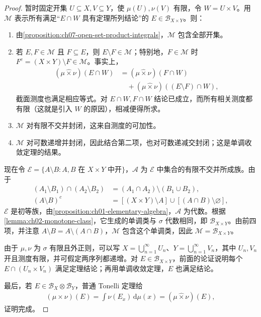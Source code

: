 \documentclass[../../main.tex]{subfiles}
\begin{document}
\begin{proof}
暂时固定开集 $U\subseteq X,V\subseteq Y$，使 $\mu(U),\nu(V)$ 有限，令 $W=U\times V$。用 $\mathcal M$ 表示所有满足“$E\cap W$ 具有定理所列结论”的 $E\in\mathscr B_{X\times Y}$。则：
\begin{enumerate}[label=\roman*.,ref=(\roman*)]
\item 由\cref{proposition:ch07-open-set-product-integrals}，$\mathcal M$ 包含全部开集。
\item 若 $E,F\in\mathcal M$ 且 $F\subseteq E$，则 $E\setminus F\in\mathcal M$；特别地，$F\in\mathcal M$ 时 $F^c=(X\times Y)\setminus F\in\mathcal M$。事实上，
\begin{align*}
(\mu\mathbin{\widehat\times}\nu)(E\cap W)
&=(\mu\mathbin{\widehat\times}\nu)(F\cap W)\\
&\quad+(\mu\mathbin{\widehat\times}\nu)((E\setminus F)\cap W),
\end{align*}
截面测度也满足相应等式。对 $E\cap W,F\cap W$ 结论已成立，而所有相关测度都有限（这就是引入 $W$ 的原因），相减便得所求。
\item $\mathcal M$ 对有限不交并封闭，这来自测度的可加性。
\item $\mathcal M$ 对可数递增并封闭，因此结合第二项，也对可数递减交封闭；这是单调收敛定理的结果。
\end{enumerate}
现在令 $\mathcal E=\{A\setminus B:A,B\text{ 在 }X\times Y\text{ 中开}\}$，$\mathcal A$ 为 $\mathcal E$ 中集合的有限不交并所成族。由于
\begin{align*}
(A_1\setminus B_1)\cap(A_2\setminus B_2)&=(A_1\cap A_2)\setminus(B_1\cup B_2),\\
(A\setminus B)^c&=[(X\times Y)\setminus A]\cup[(A\cap B)\setminus\varnothing],
\end{align*}
$\mathcal E$ 是初等族，由\cref{proposition:ch01-elementary-algebra}，$\mathcal A$ 为代数。根据\cref{lemma:ch02-monotone-class}，它生成的单调类与 $\sigma$ 代数相同，即 $\mathscr B_{X\times Y}$。由前四项，并注意 $A\setminus B=A\setminus(A\cap B)$，$\mathcal M$ 包含这个单调类，因此 $\mathcal M=\mathscr B_{X\times Y}$。

由于 $\mu,\nu$ 为 $\sigma$ 有限且外正则，可以写 $X=\bigcup_{n=1}^\infty U_n$、$Y=\bigcup_{n=1}^\infty V_n$，其中 $U_n,V_n$ 开且测度有限，并可假定两序列都递增。对 $E\in\mathscr B_{X\times Y}$，前面的论证说明每个 $E\cap(U_n\times V_n)$ 满足定理结论；再用单调收敛定理，$E$ 也满足结论。

最后，若 $E\in\mathscr B_X\otimes\mathscr B_Y$，普通 Tonelli 定理给
\begin{align*}
(\mu\times\nu)(E)=\int\nu(E_x)\,\mathrm d\mu(x)
=(\mu\mathbin{\widehat\times}\nu)(E),
\end{align*}
证明完成。
\end{proof}
\end{document}
